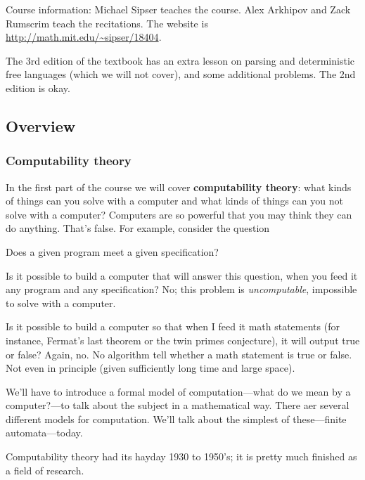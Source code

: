 Course information: Michael Sipser teaches the course. Alex Arkhipov and Zack Rumscrim teach the recitations. The website is 
\url{http://math.mit.edu/\~sipser/18404}.

The 3rd edition of the textbook has an extra lesson on parsing and  deterministic free languages (which we will not cover), and some additional problems. The 2nd edition is okay.


\subsection{Overview}

\subsubsection{Computability theory}

In the first part of the course we will cover \textbf{computability theory}: what kinds of things can you solve with a computer and what kinds of things can you not solve with a computer? Computers are so powerful that you may think they can do anything. That's false. For example, consider the question

\begin{center}Does a given program meet a given specification?\end{center}

\noindent
Is it possible to build a computer that will answer this question, when you feed it any program and any specification? No; this problem is {\it uncomputable}, impossible to solve with a computer. 

Is it possible to build a computer so that when I feed it math statements (for instance, Fermat's last theorem or the twin primes conjecture), it will output true or false? Again, no. No algorithm tell whether a math statement is true or false. Not even in principle (given sufficiently long time and large space).

We'll have to introduce a formal model of computation---what do we mean by a computer?---to talk about the subject in a mathematical way. There aer several different models for computation. We'll talk about the simplest of these---finite automata---today.

Computability theory had its hayday 1930 to 1950's; it is pretty much finished as a field of research. 

